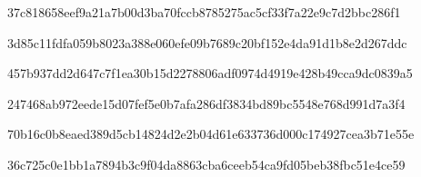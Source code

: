 \par\noindent\begin{minipage}{\linewidth}
\par
{\footnotesize\ttfamily 37c818658eef9a21a7b00d3ba70fccb8785275ac5cf33f7a22e9c7d2bbc286f1}\par
\end{minipage}\par\smallskip
\par\noindent\begin{minipage}{\linewidth}
\par
{\footnotesize\ttfamily 3d85c11fdfa059b8023a388e060efe09b7689c20bf152e4da91d1b8e2d267ddc}\par
\end{minipage}\par\smallskip
\par\noindent\begin{minipage}{\linewidth}
\par
{\footnotesize\ttfamily 457b937dd2d647c7f1ea30b15d2278806adf0974d4919e428b49cca9dc0839a5}\par
\end{minipage}\par\smallskip
\par\noindent\begin{minipage}{\linewidth}
\par
{\footnotesize\ttfamily 247468ab972eede15d07fef5e0b7afa286df3834bd89bc5548e768d991d7a3f4}\par
\end{minipage}\par\smallskip
\par\noindent\begin{minipage}{\linewidth}
\par
{\footnotesize\ttfamily 70b16c0b8eaed389d5cb14824d2e2b04d61e633736d000c174927cea3b71e55e}\par
\end{minipage}\par\smallskip
\par\noindent\begin{minipage}{\linewidth}
\par
{\footnotesize\ttfamily 36c725c0e1bb1a7894b3c9f04da8863cba6ceeb54ca9fd05beb38fbc51e4ce59}\par
\end{minipage}\par\smallskip
